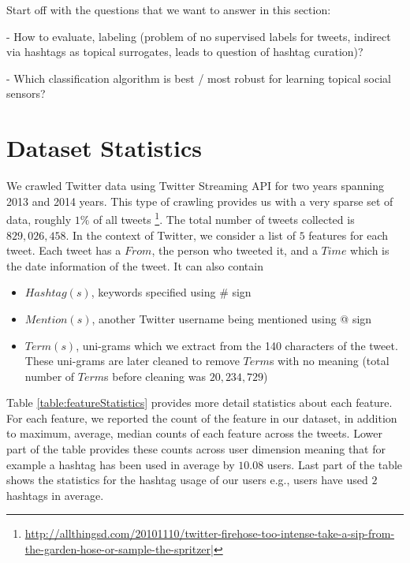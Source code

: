 \documentclass[letterpaper]{article}
\begin{document}
Start off with the questions that we want to answer in this section:

- How to evaluate, labeling (problem of no supervised labels for tweets, indirect via hashtags as topical surrogates, leads to question of hashtag curation)?

- Which classification algorithm is best / most robust for learning topical social sensors?

\section{Dataset Statistics}

We crawled Twitter data using Twitter Streaming API for two years spanning 2013 and 2014 years. This type of crawling provides us with a very sparse set of data, roughly $1\%$ of all tweets \footnote{\hyperref[]{http://allthingsd.com/20101110/twitter-firehose-too-intense-take-a-sip-from-the-garden-hose-or-sample-the-spritzer|}}. The total number of tweets collected is $829,026,458$. In the context of Twitter, we consider a list of $5$ features for each tweet. Each tweet has a $From$, the person who tweeted it, and a $Time$ which is the date information of the tweet. It can also contain 
\begin{itemize}
\item $Hashtag(s)$, keywords specified using \# sign
\item $Mention(s)$, another Twitter username being mentioned using @ sign
\item $Term(s)$, uni-grams which we extract from the 140 characters of the tweet. These uni-grams are later cleaned to remove $Term$s with no meaning (total number of $Term$s before cleaning was $20,234,729$)
\end{itemize}
Table \ref{table:featureStatistics} provides more detail statistics about each feature. For each feature, we reported the count of the feature in our dataset, in addition to maximum, average, median counts of each feature across the tweets. Lower part of the table provides these counts across user dimension meaning that for example a hashtag has been used in average by $10.08$ users. Last part of the table shows the statistics for the hashtag usage of our users e.g., users have used $2$ hashtags in average.
\end{document}
